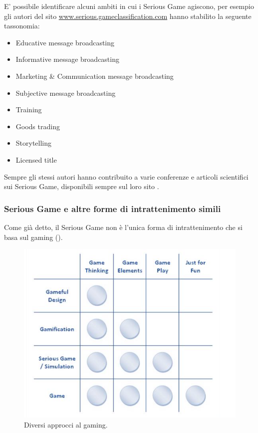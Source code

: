 E' possibile identificare alcuni ambiti in cui i Serious Game agiscono, per esempio gli autori del sito \url{www.serious.gameclassification.com} \cite{seriousclass} hanno stabilito la seguente tassonomia: 

\begin{itemize}
\item Educative message broadcasting 
\item Informative message broadcasting
\item Marketing \& Communication message broadcasting
\item Subjective message broadcasting
\item Training
\item Goods trading
\item Storytelling
\item Licensed title
\end{itemize}

Sempre gli stessi autori hanno contribuito a varie conferenze e articoli scientifici sui Serious Game, disponibili sempre sul loro sito \cite{seriousclass}.


\subsubsection{Serious Game e altre forme di intrattenimento simili}
\label{sec:distinzioni}

Come già detto, il Serious Game non è l'unica forma di intrattenimento che si basa sul gaming (\myfig{\ref{fig:gameschema}}). 

\begin{figure}[h]
\centerline{\includegraphics[scale=0.3]{images/statoarte/gameschema.png}}
\caption{Diversi approcci al gaming.}
\label{fig:gameschema}
\end{figure}

